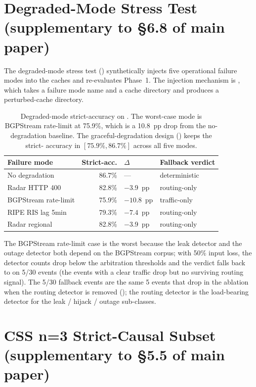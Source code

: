 \documentclass[sigcomm,nonatbib]{acmart}
\begin{document}
\section{Degraded-Mode Stress Test (supplementary to \S6.8 of main paper)}
\label{sec:supp-deg-stress}

The degraded-mode stress test ()
synthetically injects five operational failure modes into
the caches and re-evaluates Phase~1. The injection
mechanism is , which
takes a failure mode name and a cache directory and
produces a perturbed-cache directory.

\begin{table}[h]
\centering
\small
\setlength{\tabcolsep}{3pt}
\begin{tabular}{p{}rp{}p{}}
\hline
Failure mode & Strict-acc. & $\Delta$ & Fallback verdict \\ \hline
No degradation & 86.7\% & --- & deterministic \\
\cf{} Radar HTTP 400 & 82.8\% & $-3.9$~pp & routing-only \\
BGPStream rate-limit & 75.9\% & $-10.8$~pp & traffic-only \\
RIPE RIS lag 5min & 79.3\% & $-7.4$~pp & routing-only \\
\cf{} Radar regional & 82.8\% & $-3.9$~pp & routing-only \\
\hline
\end{tabular}

\caption{Degraded-mode strict-accuracy on . The
worst-case mode is BGPStream rate-limit at 75.9\%,
which is a 10.8~pp drop from the no-degradation
baseline. The graceful-degradation design
() keeps the strict-
accuracy in $[75.9\%, 86.7\%]$ across all five modes.}
\label{tab:supp-deg-stress}
\end{table}

The BGPStream rate-limit case is the worst because the
leak detector and the outage detector both depend on
the BGPStream corpus; with 50\% input loss, the
detector counts drop below the arbitration thresholds
and the verdict falls back to on
5/30 events (the events with a clear traffic drop
but no surviving routing signal). The 5/30 fallback
events are the same 5 events that drop in the
ablation when the routing detector is removed
(); the routing detector
is the load-bearing detector for the leak / hijack /
outage sub-classes.

\section{CSS n=3 Strict-Causal Subset (supplementary to \S5.5 of main paper)}
\label{sec:supp-css}
\end{document}
